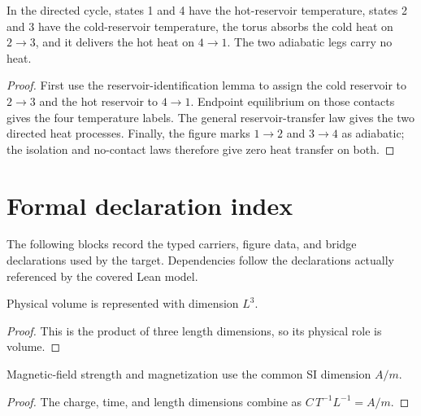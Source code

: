 \begin{theorem}
  \label{thm:physics:IPhO_2026_3_C_1:target}
  In the directed cycle, states 1 and 4 have the hot-reservoir
  temperature, states 2 and 3 have the cold-reservoir temperature,
  the torus absorbs the cold heat on \(2\to3\), and it delivers the hot
  heat on \(4\to1\).  The two adiabatic legs carry no heat.
\end{theorem}
\begin{proof}
  First use the reservoir-identification lemma to assign the cold reservoir
  to \(2\to3\) and the hot reservoir to \(4\to1\).  Endpoint equilibrium on
  those contacts gives the four temperature labels.  The general
  reservoir-transfer law gives the two directed heat processes.  Finally,
  the figure marks \(1\to2\) and \(3\to4\) as adiabatic; the isolation and
  no-contact laws therefore give zero heat transfer on both.
\end{proof}

\section*{Formal declaration index}
The following blocks record the typed carriers, figure data, and bridge
declarations used by the target.  Dependencies follow the declarations
actually referenced by the covered Lean model.

\begin{definition}
  \label{def:physics:IPhO_2026_3_C_1:aux001}
  Physical volume is represented with dimension \(L^3\).
\end{definition}
\begin{proof}
  This is the product of three length dimensions, so its physical role is
  volume.
\end{proof}

\begin{definition}
  \label{def:physics:IPhO_2026_3_C_1:aux002}
  Magnetic-field strength and magnetization use the common SI dimension
  \(A/m\).
\end{definition}
\begin{proof}
  The charge, time, and length dimensions combine as
  \(C\,T^{-1}L^{-1}=A/m\).
\end{proof}

